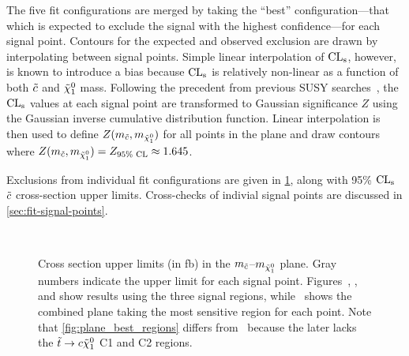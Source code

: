 The five fit configurations are merged by taking the ``best'' configuration---that which is expected to exclude the signal with the highest confidence---for each signal point. Contours for the expected and observed exclusion are drawn by interpolating between signal points. Simple linear interpolation of $\mathrm{CL}_{\mathrm{s}}$, however,  is known to introduce a bias because $\mathrm{CL}_{\mathrm{s}}$ is relatively non-linear as a function of both $\tilde{c}$ and $\tilde{\chi}_1^0$ mass. Following the precedent from previous SUSY searches~\cite{susy-limit-setting}, the $\mathrm{CL}_{\mathrm{s}}$ values at each signal point are transformed to Gaussian significance $Z$ using the Gaussian inverse cumulative distribution function. Linear interpolation is then used to define $Z(m_{\tilde{c}}, m_{\tilde{\chi}_1^0})$ for all points in the plane and draw contours where $Z(m_{\tilde{c}}, m_{\tilde{\chi}_1^0}) = Z_{95 \% \text{ CL}} \approx 1.645$.

Exclusions from individual fit configurations are given in \cref{fig:exclusion_plane_ul}, along with 95\% $\mathrm{CL}_{\mathrm{s}}$ $\tilde{c}$ cross-section upper limits. %
Cross-checks of indivial signal points are discussed in \cref{sec:fit-signal-points}.

\begin{figure}
\centering
{}
 \\
\caption[Cross section upper limits in the $m_{\scharm}$--$m_{\neut}$ plane]{
Cross section upper limits (in fb) in the $m_{\scharm}$--$m_{\neut}$ plane. Gray numbers indicate the upper limit for each signal point. Figures~, , and  show results using the three signal regions, while~ shows the combined plane taking the most sensitive region for each point. Note that \cref{fig:plane_best_regions} differs from~ because the later lacks the $\tilde{t} \to c \tilde{\chi}_1^0$ C1 and C2 regions.
}
\label{fig:exclusion_plane_ul}
\end{figure}


